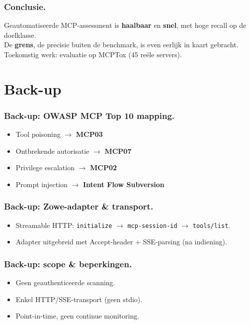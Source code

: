 \documentclass[aspectratio=169]{beamer}
\newcommand{\posternav}[4]{}
\begin{document}
\begin{frame}
  \frametitle{Conclusie.}
  \centering\large
  Geautomatiseerde MCP-assessment is \textbf{haalbaar} en \textbf{snel},
  met hoge recall op de doelklasse.\\[1ex]
  De \textbf{grens}, de precisie buiten de benchmark, is even eerlijk in
  kaart gebracht.
  \vfill
  \normalsize Toekomstig werk: evaluatie op MCPTox (45 re\"ele servers).
  \posternav{0.52}{0.20}{0.98}{0.72}   %
\end{frame}

\section*{Back-up}

\begin{frame}
  \frametitle{Back-up: OWASP MCP Top 10 mapping.}
  \begin{itemize}
    \item Tool poisoning $\rightarrow$ \textbf{MCP03}
    \item Ontbrekende autorisatie $\rightarrow$ \textbf{MCP07}
    \item Privilege escalation $\rightarrow$ \textbf{MCP02}
    \item Prompt injection $\rightarrow$ \textbf{Intent Flow Subversion}
  \end{itemize}
\end{frame}

\begin{frame}
  \frametitle{Back-up: Zowe-adapter \& transport.}
  \begin{itemize}
    \item Streamable HTTP: \texttt{initialize} $\rightarrow$ \texttt{mcp-session-id} $\rightarrow$ \texttt{tools/list}.
    \item Adapter uitgebreid met Accept-header + SSE-parsing (na indiening).
  \end{itemize}
\end{frame}

\begin{frame}
  \frametitle{Back-up: scope \& beperkingen.}
  \begin{itemize}
    \item Geen geauthenticeerde scanning.
    \item Enkel HTTP/SSE-transport (geen stdio).
    \item Point-in-time, geen continue monitoring.
  \end{itemize}
\end{frame}
\end{document}
